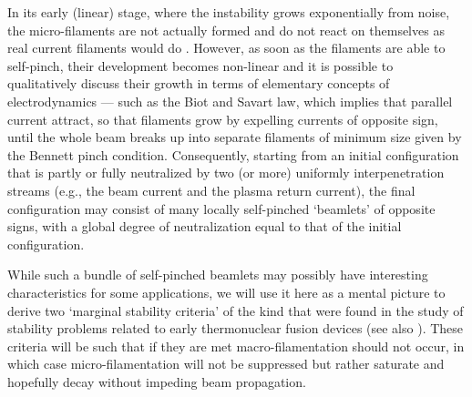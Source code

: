 \documentclass [12pt,a4paper,     ]{report} %
\begin{document}
   In its early (linear) stage, where the instability grows exponentially from noise, the micro-filaments are not actually formed and do not react on themselves as real current filaments would do \cite{MONTG1979-}.  However, as soon as the filaments are able to self-pinch, their development becomes non-linear and it is possible to qualitatively discuss their growth in terms of elementary concepts of electrodynamics --- such as the Biot and Savart law, which implies that parallel current attract, so that filaments grow by expelling currents of opposite sign, until the whole beam breaks up into separate filaments of minimum size given by the Bennett pinch condition.  Consequently, starting from an initial configuration that is partly or fully neutralized by two (or more) uniformly interpenetration streams (e.g., the beam current and the plasma return current), the final configuration may consist of many locally self-pinched `beamlets' of opposite signs, with a global degree of neutralization equal to that of the initial configuration.

   While such a bundle of self-pinched beamlets may possibly have interesting characteristics for some applications, we will use it here as a mental picture to derive two `marginal stability criteria' of the kind that were found in the study of stability problems related to early thermonuclear fusion devices \cite{FURTH1963-} (see also \cite{LEE--1980B}).   These criteria will be such that if they are met macro-filamentation should not occur, in which case micro-filamentation will not be suppressed but rather saturate and hopefully decay without impeding beam propagation.
\end{document}
